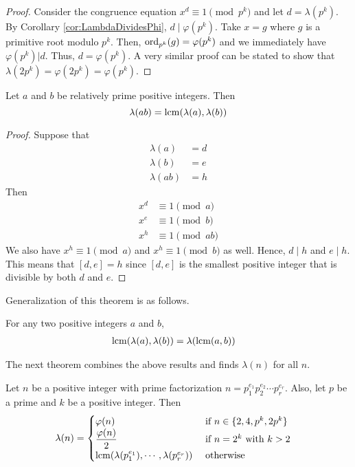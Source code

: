 \begin{proof}
	Consider the congruence equation $x^d\equiv1\pmod{p^k}$ and let $d=\lambda(p^k)$. By Corollary \ref{cor:LambdaDividesPhi}, $d \mid \varphi(p^k)$. Take $x=g$ where $g$ is a primitive root modulo $p^k$. Then, $\operatorname{ord}_{p^k}(g)=\varphi(p^k)$ and we immediately have $\varphi(p^k)|d$. Thus, $d=\varphi(p^k)$. A very similar proof can be stated to show that $\lambda (2p^k)=\varphi (2p^k) = \varphi(p^k)$.
\end{proof}

\begin{theorem}
	Let $a$ and $b$ be relatively prime positive integers. Then
 \[\lambda(ab)=\operatorname{lcm}(\lambda(a),\lambda(b))\]
\end{theorem}

\begin{proof}
	Suppose that
		\begin{align*}
			\lambda(a)
				& =d\\
			\lambda(b)
				& =e\\
			\lambda(ab)
				& =h
		\end{align*}
	Then
		\begin{align*}
			x^d
				& \equiv1\pmod a\\
			x^e
				& \equiv1\pmod b\\
			x^{h}
				& \equiv1\pmod{ab}
		\end{align*}
	We also have $x^h\equiv1\pmod a$ and $x^h\equiv1\pmod b$ as well. Hence, $d \mid h$ and $e \mid h$. This means that $[d,e]=h$ since $[d,e]$ is the smallest positive integer that is divisible by both $d$ and $e$.
\end{proof}
Generalization of this theorem is as follows.
\begin{theorem}
	For any two positive integers $a$ and $b$,
	\begin{align*}
	\operatorname{lcm}(\lambda(a),\lambda(b)) & = \lambda(\operatorname{lcm}(a,b))
	\end{align*}
\end{theorem}
The next theorem combines the above results and finds $\lambda(n)$ for all $n$.
\begin{theorem}\label{thm:CarmichaelFormula}
	Let $n$ be a positive integer with prime factorization $n=p_1^{e_1}p_2^{e_2}\cdots p_r^{e_r}$. Also, let $p$ be a prime and $k$ be a positive integer. Then
	\begin{align*}
		\lambda(n) & =
			\begin{cases}
				\varphi(n)& \mbox{ if } n\in\{2,4,p^k,2p^k\}\\
				\dfrac{\varphi(n)}{2}& \mbox{ if }n=2^k\mbox{ with }k>2\\
				\operatorname{lcm}(\lambda(p_1^{e_1}),\cdots,\lambda(p_r^{e_r}))& \mbox{ otherwise}
			\end{cases}
	\end{align*}
\end{theorem}

